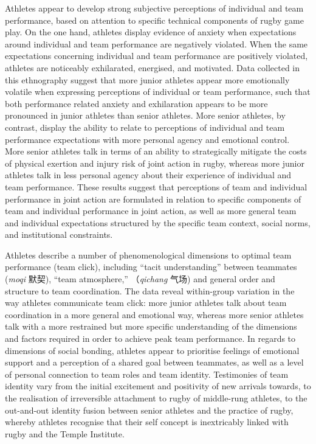 \begin{CJK}{UTF8}{gbsn}
  Athletes appear to develop strong subjective perceptions of individual and team performance, based on attention to specific technical components of rugby game play.   On the one hand, athletes display evidence of anxiety when expectations around individual and team performance are negatively violated.  When the same expectations concerning individual and team performance are positively violated, athletes are noticeably exhilarated, energised, and motivated.  Data collected in this ethnography suggest that more junior athletes appear more emotionally volatile when expressing perceptions of individual or team performance, such that both performance related anxiety and exhilaration appears to be more pronounced in junior athletes than senior athletes.  More senior athletes, by contrast, display the ability to relate to perceptions of individual and team performance expectations with more personal agency and emotional control.  More senior athletes talk in terms of an ability to strategically mitigate the costs of physical exertion and injury risk of joint action in rugby, whereas more junior athletes talk in less personal agency about their experience of individual and team performance.  These results suggest that perceptions of team and individual performance in joint action are formulated in relation to specific components of team and individual performance in joint action, as well as more general team and individual expectations structured by the specific team context, social norms, and institutional constraints.

  Athletes describe a number of phenomenological dimensions to optimal team performance (team click), including ``tacit understanding'' between teammates (\textit{moqi} 默契), ``team atmosphere,'' （\textit{qichang} 气场) and general order and structure to team coordination.  The data reveal within-group variation in the way athletes communicate team click: more junior athletes talk about team coordination in a more general and emotional way, whereas more senior athletes talk with a more restrained but more specific understanding of the dimensions and factors required in order to achieve peak team performance.  In regards to dimensions of social bonding, athletes appear to prioritise feelings of emotional support and a perception of a shared goal between teammates, as well as a level of personal connection to team roles and team identity.  Testimonies of team identity vary from the initial excitement and positivity of new arrivals towards, to the realisation of irreversible attachment to rugby of middle-rung athletes, to the out-and-out identity fusion between senior athletes and the practice of rugby, whereby athletes recognise that their self concept is inextricably linked with rugby and the Temple Institute.


\end{CJK}
